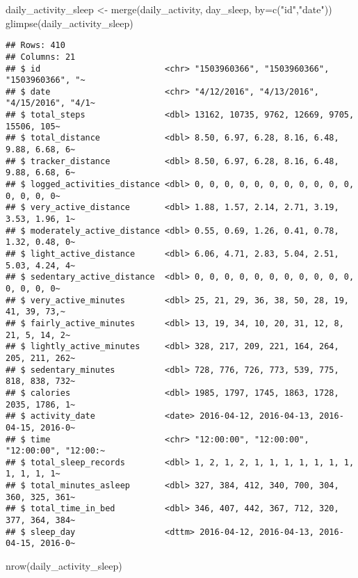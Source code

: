 \documentclass[
]{article}
\newenvironment{Shaded}{\begin{snugshade}}{\end{snugshade}}
\newcommand{\AttributeTok}[1]{\textcolor[rgb]{0.77,0.63,0.00}{#1}}
\newcommand{\FunctionTok}[1]{\textcolor[rgb]{0.00,0.00,0.00}{#1}}
\newcommand{\NormalTok}[1]{#1}
\newcommand{\OtherTok}[1]{\textcolor[rgb]{0.56,0.35,0.01}{#1}}
\newcommand{\StringTok}[1]{\textcolor[rgb]{0.31,0.60,0.02}{#1}}
\begin{document}
\begin{Shaded}
\begin{Highlighting}[]
\NormalTok{daily\_activity\_sleep }\OtherTok{\textless{}{-}} \FunctionTok{merge}\NormalTok{(daily\_activity, day\_sleep, }\AttributeTok{by=}\FunctionTok{c}\NormalTok{(}\StringTok{"id"}\NormalTok{,}\StringTok{"date"}\NormalTok{))}
\FunctionTok{glimpse}\NormalTok{(daily\_activity\_sleep)}
\end{Highlighting}
\end{Shaded}

\begin{verbatim}
## Rows: 410
## Columns: 21
## $ id                         <chr> "1503960366", "1503960366", "1503960366", "~
## $ date                       <chr> "4/12/2016", "4/13/2016", "4/15/2016", "4/1~
## $ total_steps                <dbl> 13162, 10735, 9762, 12669, 9705, 15506, 105~
## $ total_distance             <dbl> 8.50, 6.97, 6.28, 8.16, 6.48, 9.88, 6.68, 6~
## $ tracker_distance           <dbl> 8.50, 6.97, 6.28, 8.16, 6.48, 9.88, 6.68, 6~
## $ logged_activities_distance <dbl> 0, 0, 0, 0, 0, 0, 0, 0, 0, 0, 0, 0, 0, 0, 0~
## $ very_active_distance       <dbl> 1.88, 1.57, 2.14, 2.71, 3.19, 3.53, 1.96, 1~
## $ moderately_active_distance <dbl> 0.55, 0.69, 1.26, 0.41, 0.78, 1.32, 0.48, 0~
## $ light_active_distance      <dbl> 6.06, 4.71, 2.83, 5.04, 2.51, 5.03, 4.24, 4~
## $ sedentary_active_distance  <dbl> 0, 0, 0, 0, 0, 0, 0, 0, 0, 0, 0, 0, 0, 0, 0~
## $ very_active_minutes        <dbl> 25, 21, 29, 36, 38, 50, 28, 19, 41, 39, 73,~
## $ fairly_active_minutes      <dbl> 13, 19, 34, 10, 20, 31, 12, 8, 21, 5, 14, 2~
## $ lightly_active_minutes     <dbl> 328, 217, 209, 221, 164, 264, 205, 211, 262~
## $ sedentary_minutes          <dbl> 728, 776, 726, 773, 539, 775, 818, 838, 732~
## $ calories                   <dbl> 1985, 1797, 1745, 1863, 1728, 2035, 1786, 1~
## $ activity_date              <date> 2016-04-12, 2016-04-13, 2016-04-15, 2016-0~
## $ time                       <chr> "12:00:00", "12:00:00", "12:00:00", "12:00:~
## $ total_sleep_records        <dbl> 1, 2, 1, 2, 1, 1, 1, 1, 1, 1, 1, 1, 1, 1, 1~
## $ total_minutes_asleep       <dbl> 327, 384, 412, 340, 700, 304, 360, 325, 361~
## $ total_time_in_bed          <dbl> 346, 407, 442, 367, 712, 320, 377, 364, 384~
## $ sleep_day                  <dttm> 2016-04-12, 2016-04-13, 2016-04-15, 2016-0~
\end{verbatim}

\begin{Shaded}
\begin{Highlighting}[]
\FunctionTok{nrow}\NormalTok{(daily\_activity\_sleep)}
\end{Highlighting}
\end{Shaded}
\end{document}
